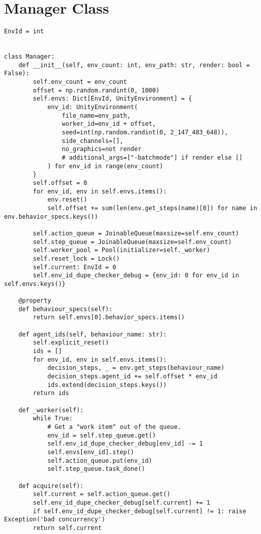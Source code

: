\section{Manager Class}\label{appendix:code:env_manager}
\begin{lstlisting}[basicstyle=\footnotesize]
EnvId = int  


class Manager:
    def __init__(self, env_count: int, env_path: str, render: bool = False):
        self.env_count = env_count
        offset = np.random.randint(0, 1000)
        self.envs: Dict[EnvId, UnityEnvironment] = {
            env_id: UnityEnvironment(
                file_name=env_path,
                worker_id=env_id + offset,
                seed=int(np.random.randint(0, 2_147_483_648)),
                side_channels=[],
                no_graphics=not render
                # additional_args=["-batchmode"] if render else []
            ) for env_id in range(env_count)
        }
        self.offset = 0
        for env_id, env in self.envs.items():
            env.reset()
            self.offset += sum(len(env.get_steps(name)[0]) for name in env.behavior_specs.keys())

        self.action_queue = JoinableQueue(maxsize=self.env_count)
        self.step_queue = JoinableQueue(maxsize=self.env_count)
        self.worker_pool = Pool(initializer=self._worker)
        self.reset_lock = Lock()
        self.current: EnvId = 0
        self.env_id_dupe_checker_debug = {env_id: 0 for env_id in self.envs.keys()}

    @property
    def behaviour_specs(self):
        return self.envs[0].behavior_specs.items()

    def agent_ids(self, behaviour_name: str):
        self.explicit_reset()
        ids = []
        for env_id, env in self.envs.items():
            decision_steps, _ = env.get_steps(behaviour_name)
            decision_steps.agent_id += self.offset * env_id
            ids.extend(decision_steps.keys())
        return ids

    def _worker(self):
        while True:
            # Get a "work item" out of the queue.
            env_id = self.step_queue.get()
            self.env_id_dupe_checker_debug[env_id] -= 1
            self.envs[env_id].step()
            self.action_queue.put(env_id)
            self.step_queue.task_done()

    def acquire(self):
        self.current = self.action_queue.get()
        self.env_id_dupe_checker_debug[self.current] += 1
        if self.env_id_dupe_checker_debug[self.current] != 1: raise Exception('bad concurrency')
        return self.current


\end{lstlisting}
